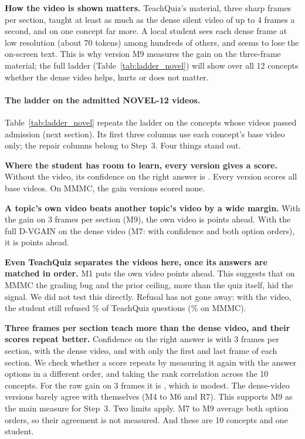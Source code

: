 \documentclass[11pt]{article}
\begin{document}
\textbf{How the video is shown matters.} TeachQuiz's material, three sharp frames per section, taught at least as
much as the dense silent video of up to 4 frames a second, and on one concept far more. A local student sees each
dense frame at low resolution (about 70 tokens) among hundreds of others, and seems to lose the on-screen text. This
is why version M9 measures the gain on the three-frame material; the full ladder (Table~\ref{tab:ladder_novel}) will show
over all 12 concepts whether the dense video helps, hurts or does not matter.




\paragraph{The ladder on the admitted NOVEL-12 videos.} Table~\ref{tab:ladder_novel} repeats the ladder on the
\LadNovelTopics{} concepts whose videos passed admission (next section). Its first three columns use each concept's
base video only; the repair columns belong to Step~3. Four things stand out.

\textbf{Where the student has room to learn, every version gives a score.} Without the video, its confidence on the
right answer is \LadNovelSBlind{}. Every version scores all \LadNovelTopics{} base videos. On MMMC, the gain
versions scored none.

\textbf{A topic's own video beats another topic's video by a wide margin.} With the gain on 3 frames per section (M9),
the own video is \LadNovelSepNine{} points ahead. With the full D-VGAIN on the dense video (M7: with confidence and
both option orders), it is \LadNovelSepSeven{} points ahead.

\textbf{Even TeachQuiz separates the videos here, once its answers are matched in order.} M1 puts the own video
\LadNovelSepOne{} points ahead. This suggests that on MMMC the grading bug and the prior ceiling, more than the quiz
itself, hid the signal. We did not test this directly. Refusal has not gone away: with the video, the student still refused \LadNovelAbstained\% of
TeachQuiz questions (\NullWithVideo\% on MMMC).

\textbf{Three frames per section teach more than the dense video, and their scores repeat better.} Confidence on the
right answer is \LadNovelSFrames{} with 3 frames per section, \LadNovelSVisual{} with the dense video, and
\LadNovelSStatic{} with only the first and last frame of each section. We check whether a score repeats by measuring it
again with the answer options in a different order, and taking the rank correlation across the 10 concepts. For the
raw gain on 3 frames it is \LadNovelAgreeRawNine{}, which is modest. The dense-video versions barely agree with themselves (M4 to M6
and R7). This supports M9 as the main measure for Step~3. Two limits apply. M7 to M9 average both option orders, so
their agreement is not measured. And these are 10 concepts and one student.
\end{document}
